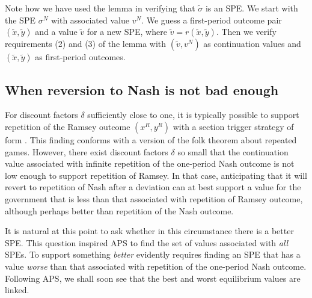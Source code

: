 Note how we have used the lemma in verifying that $\tilde \sigma$
is an SPE.  We start with the SPE $\sigma^N$ with associated value
$v^N$.  We guess a first-period outcome pair $(\tilde x, \tilde
y)$ and a value $\tilde v$ for a new SPE, where $\tilde v =
r(\tilde x, \tilde y)$. Then we verify requirements (2) and (3) of
the lemma with $(\tilde v, v^N)$ as continuation values and
$(\tilde x, \tilde y)$ as first-period outcomes.



\subsection{When reversion to Nash is not bad enough}

For discount factors $\delta$ sufficiently close to one, it is typically
 possible to support repetition of the Ramsey outcome
$(x^R, y^R)$ with a section  trigger strategy of  form  . This finding conforms
with a version
of the folk theorem about repeated games.  However,
there exist discount factors $\delta$ so small
that the continuation value associated with infinite   repetition of the one-period Nash
outcome is not low enough to support repetition of Ramsey.
In that case, anticipating that it will revert
to repetition of Nash after a deviation  can at best support
a value for the government that
is less than that associated with repetition of Ramsey outcome,
although perhaps
better than
repetition of the Nash outcome.

It is natural at this point to ask whether in this circumstance  there is a better SPE.
This question inspired  APS to find the
set of values associated with {\it all\/} SPEs.
 To support something {\it better\/} evidently requires finding an SPE
that has a value {\it worse\/} than that
associated with repetition of the one-period Nash outcome.
  Following APS, we shall soon
see that the best and worst equilibrium values are linked.

    
